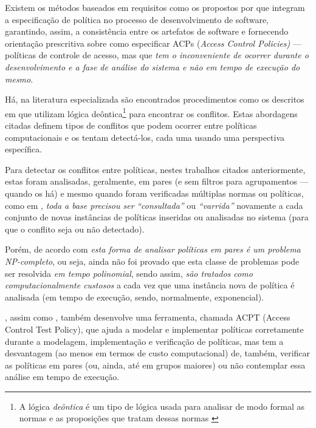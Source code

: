 Existem os métodos baseados em requisitos como os propostos por  que integram a especificação de política no processo de desenvolvimento de software, garantindo, assim, a consistência entre os artefatos de software e fornecendo orientação prescritiva sobre como especificar ACPs (\textit{Access Control Policies)} --- políticas de controle de acesso, mas que\textit{ tem o inconveniente de ocorrer durante o desenvolvimento e a fase de análise do sistema e não em tempo de execução do mesmo}.

Há, na literatura especializada são encontrados procedimentos como os descritos em  que utilizam lógica deôntica\footnote{A lógica \textit{deôntica} é um tipo de lógica usada para analisar de modo formal as normas e as proposições que tratam dessas normas \cite{eduardo2017}} para encontrar os conflitos. Estas abordagens citadas definem tipos de conflitos que podem ocorrer entre políticas computacionais e os tentam detectá-los, cada uma usando uma perspectiva específica. 

Para detectar os conflitos entre políticas, nestes trabalhos citados anteriormente, estas foram analisadas, geralmente, em pares (e sem filtros para agrupamentos --- quando os há) e mesmo quando foram verificadas múltiplas normas ou políticas, como em , \textit{toda a base precisou ser} \textit{``consultada''} ou \textit{``varrida''} novamente a cada conjunto de novas instâncias de políticas inseridas ou analisadas no sistema (para que o conflito seja ou não detectado).

Porém, de acordo com  \textit{esta forma de analisar políticas em pares é um problema NP-completo}, ou seja, ainda não foi provado que esta classe de problemas pode ser resolvida \textit{em tempo polinomial}, sendo assim, \textit{são tratados como computacionalmente custosos} a cada vez que uma instância nova de política é analisada (em tempo de execução, sendo, normalmente, exponencial). 

, assim como , também desenvolve uma ferramenta, chamada ACPT (Access Control Test Policy), que ajuda a modelar e implementar políticas corretamente durante a modelagem, implementação e verificação de políticas, mas tem a desvantagem (ao menos em termos de custo computacional) de, também, verificar as políticas em pares (ou, ainda, até em grupos maiores) ou não contemplar essa análise em tempo de execução.

